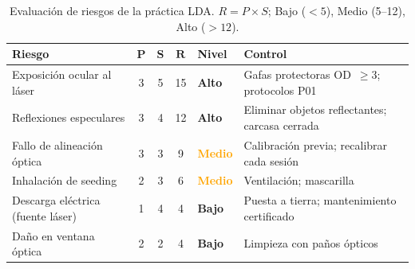 \documentclass[12pt,a4paper]{article}
\begin{document}
\begin{table}[H]
	\centering
	\caption{Evaluación de riesgos de la práctica LDA.
		$R = P \times S$; Bajo ($<5$), Medio (5--12), Alto ($>12$).}
	\label{tab:riesgos}
	\begin{tabular}{>{\raggedright\arraybackslash}p{3.5cm} c c c l
		>{\raggedright\arraybackslash}p{3.5cm}}
		\toprule
		\textbf{Riesgo} & $\boldsymbol{P}$                     & $\boldsymbol{S}$
		                & $\boldsymbol{R}$
		                & \textbf{Nivel}                       & \textbf{Control}      \\
		\midrule
		\rowcolor{aerored!15}
		Exposición ocular al láser
		                & 3                                    & 5                & 15
		                & \textcolor{aerored}{\textbf{Alto}}
		                & Gafas protectoras OD~$\geq3$;
		protocolos P01                                                                 \\
		\rowcolor{aerored!15}
		Reflexiones especulares
		                & 3                                    & 4                & 12
		                & \textcolor{aerored}{\textbf{Alto}}
		                & Eliminar objetos reflectantes;
		carcasa cerrada                                                                \\
		\rowcolor{yellow!25}
		Fallo de alineación óptica
		                & 3                                    & 3                & 9
		                & \textcolor{orange}{\textbf{Medio}}
		                & Calibración previa;
		recalibrar cada sesión                                                         \\
		\rowcolor{yellow!25}
		Inhalación de seeding
		                & 2                                    & 3                & 6
		                & \textcolor{orange}{\textbf{Medio}}
		                & Ventilación; mascarilla                                      \\
		\rowcolor{aerogreen!15}
		Descarga eléctrica (fuente láser)
		                & 1                                    & 4                & 4
		                & \textcolor{aerogreen}{\textbf{Bajo}}
		                & Puesta a tierra;
		mantenimiento certificado                                                      \\
		\rowcolor{aerogreen!15}
		Daño en ventana óptica
		                & 2                                    & 2                & 4
		                & \textcolor{aerogreen}{\textbf{Bajo}}
		                & Limpieza con paños ópticos                                   \\
		\bottomrule
	\end{tabular}
\end{table}
\end{document}
